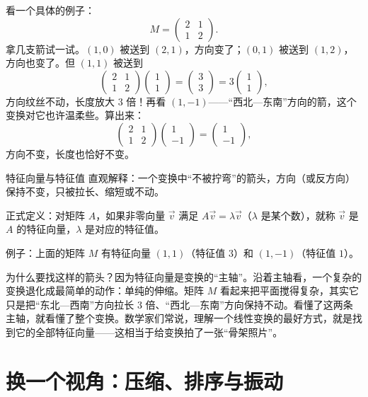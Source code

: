 看一个具体的例子：
\[
M=\begin{pmatrix}2&1\\1&2\end{pmatrix}.
\]
拿几支箭试一试。$(1,0)$ 被送到 $(2,1)$，方向变了；$(0,1)$ 被送到 $(1,2)$，方向也变了。但 $(1,1)$ 被送到
\[
\begin{pmatrix}2&1\\1&2\end{pmatrix}\begin{pmatrix}1\\1\end{pmatrix}=\begin{pmatrix}3\\3\end{pmatrix}=3\begin{pmatrix}1\\1\end{pmatrix},
\]
方向纹丝不动，长度放大 $3$ 倍！再看 $(1,-1)$——“西北—东南”方向的箭，这个变换对它也许温柔些。算出来：
\[
\begin{pmatrix}2&1\\1&2\end{pmatrix}\begin{pmatrix}1\\-1\end{pmatrix}=\begin{pmatrix}1\\-1\end{pmatrix},
\]
方向不变，长度也恰好不变。

\begin{shuyu}{特征向量与特征值}
直观解释：一个变换中“不被拧弯”的箭头，方向（或反方向）保持不变，只被拉长、缩短或不动。

正式定义：对矩阵 $A$，如果非零向量 $\vec{v}$ 满足 $A\vec{v}=\lambda\vec{v}$（$\lambda$ 是某个数），就称 $\vec{v}$ 是 $A$ 的特征向量，$\lambda$ 是对应的特征值。

例子：上面的矩阵 $M$ 有特征向量 $(1,1)$（特征值 $3$）和 $(1,-1)$（特征值 $1$）。
\end{shuyu}

为什么要找这样的箭头？因为特征向量是变换的“主轴”。沿着主轴看，一个复杂的变换退化成最简单的动作：单纯的伸缩。矩阵 $M$ 看起来把平面搅得复杂，其实它只是把“东北—西南”方向拉长 $3$ 倍、“西北—东南”方向保持不动。看懂了这两条主轴，就看懂了整个变换。数学家们常说，理解一个线性变换的最好方式，就是找到它的全部特征向量——这相当于给变换拍了一张“骨架照片”。

\section{换一个视角：压缩、排序与振动}


